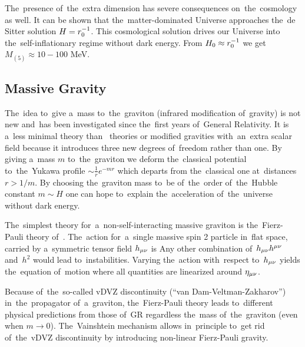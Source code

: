 The~presence of~the~extra dimension has severe consequences on~the~cosmology as well. It can be shown \parencite{2010deto.book.....A,2009PhLB..674..237M} that the~matter-dominated Universe approaches the~de Sitter solution $H=r_0^{-1}$. This cosmological solution drives our Universe into the~self-inflationary regime without dark energy. From $H_0\approx r_0^{-1}$ we get $M_{(5)}\approx10-100$ MeV.
\subsection{Massive Gravity}
The~idea to~give a~mass to~the~graviton (infrared modification of~gravity) is not new and~has been investigated since the~first years of~General Relativity. It is a~less minimal theory than \fR\ theories or modified gravities with~an~extra scalar field because it introduces three new degrees of~freedom rather than one. By giving a~mass $m$ to~the~graviton we deform the~classical potential to~the~Yukawa profile $\sim\frac1r e^{-mr}$ which departs from the~classical one at~distances $r>1/m$. By choosing the~graviton mass to~be of~the~order of~the~Hubble constant $m\sim H$ one can hope to~explain the~acceleration of~the~universe without dark energy.

The~simplest theory for~a~non-self-interacting massive graviton is the~Fierz-Pauli theory of~\textcite{1939RSPSA.173..211F}. The~action for~a~single massive spin 2 particle in~flat space, carried by a~symmetric tensor field $h_{\mu\nu}$ is
Any other combination of~$h_{\mu\nu} h^{\mu\nu}$ and~$h^2$ would lead to~instabilities. Varying the~action with~respect to~$h_{\mu\nu}$ yields the~equation of~motion
where all quantities are linearized around $\eta_{\mu\nu}$.

Because of~the~so-called vDVZ discontinuity (``van Dam-Veltman-Zakharov'') in~the~propagator of~a~graviton, the~Fierz-Pauli theory leads to~different physical predictions from those of~GR regardless the~mass of~the~graviton (even when $m\to0$). The~Vainshtein mechanism \parencite{1972PhLB...39..393V} allows in~principle to~get rid of~the~vDVZ discontinuity by introducing non-linear Fierz-Pauli gravity.

